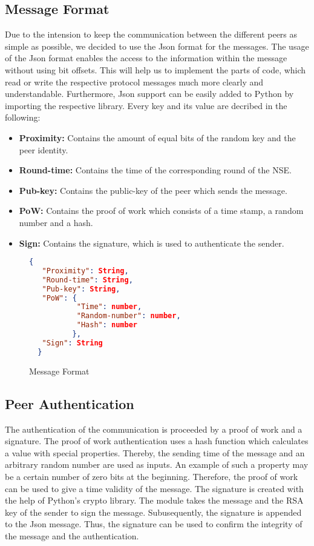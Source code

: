 \documentclass[IN,11pt,twoside,openright,english]{article}
\begin{document}
\subsection{Message Format}
Due to the intension to keep the communication between the different peers as simple as possible, we decided to use the Json format for the messages. The usage of the Json format enables the access to the information within the message without using bit offsets. This will help us to implement the parts of code, which read or write the respective protocol messages much more clearly and understandable.
Furthermore, Json support can be easily added to Python by importing the respective library.\newline
\newline Every key and its value are decribed in the following: \newline

\begin{itemize}
\item \textbf{Proximity:} Contains the amount of equal bits of the random key and the peer identity.
\item \textbf{Round-time:} Contains the time of the corresponding round of the NSE.
\item \textbf{Pub-key:} Contains the public-key of the peer which sends the message.
\item \textbf{PoW:} Contains the proof of work which consists of a time stamp, a random number and a hash.
\item \textbf{Sign:} Contains the signature, which is used to authenticate the sender.
\end{itemize}

\begin{figure}[h]
  \centering
  \begin{lstlisting}[language=json,firstnumber=1]
  {
   "Proximity": String,
   "Round-time": String,
   "Pub-key": String,
   "PoW": {
           "Time": number,
           "Random-number": number,
           "Hash": number
          },
   "Sign": String
  }
  \end{lstlisting}
\caption{Message Format}
\end{figure}

\subsection{Peer Authentication}
The authentication of the communication is proceeded by a proof of work and a signature.
The proof of work authentication uses a hash function which calculates a value with special properties. Thereby, the sending time of the message and an arbitrary random number are used as inputs. An example of such a property may be a certain number of zero bits at the beginning. Therefore, the proof of work can be used to give a time validity of the message.
The signature is created with the help of Python's crypto library. The module takes the message and the RSA key of the sender to sign the message. Subusequently, the signature is appended to the Json message. Thus, the signature can be used to confirm the integrity of the message and the authentication.
\end{document}
